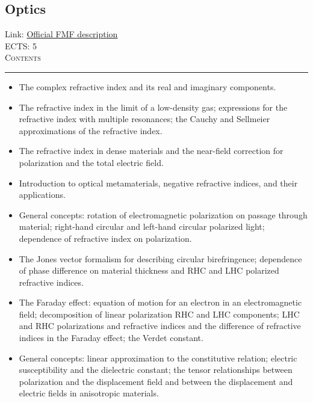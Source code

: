 \documentclass[11pt, a4paper]{article}
\newenvironment{course}[3]{
\subsection{#1}%
Link: \href{#2}{Official FMF description}\\%
ECTS: #3%
\vspace{1ex}
\\
{\large \textsc{Contents}}\\[-0.9ex]%
\rule{\textwidth}{0.5pt}
\vspace{-3ex}
}
{}
\newenvironment{chapter}[1]{
\begin{tcolorbox}[title=#1, breakable]
}
{\end{tcolorbox}}
\begin{document}
\begin{course}{Optics}{https://www.fmf.uni-lj.si/en/study-physics/programmes/1fiz/2020/7000777/courses/1165/}{5}
\begin{chapter}{The refractive index}
\begin{itemize}
            \item The complex refractive index and its real and imaginary components.

            \item The refractive index in the limit of a low-density gas; expressions for the refractive index with multiple resonances; the Cauchy and Sellmeier approximations of the refractive index.

            \item The refractive index in dense materials and the near-field correction for polarization and the total electric field.

            \item Introduction to optical metamaterials, negative refractive indices, and their applications.
        
        \end{itemize}
    \end{chapter}

    \begin{chapter}{Optical activity}
        \begin{itemize}
        
            \item General concepts: rotation of electromagnetic polarization on passage through material; right-hand circular and left-hand circular polarized light; dependence of refractive index on polarization.

            \item The Jones vector formalism for describing circular birefringence; dependence of phase difference on material thickness and RHC and LHC polarized refractive indices.

            \item The Faraday effect: equation of motion for an electron in an electromagnetic field; decomposition of linear polarization RHC and LHC components; LHC and RHC polarizations and refractive indices and the difference of refractive indices in the Faraday effect; the Verdet constant.

        \end{itemize}
    \end{chapter}

    \begin{chapter}{Optically anisotropic materials}
        \begin{itemize}
        
            \item General concepts: linear approximation to the constitutive relation; electric susceptibility and the dielectric constant; the tensor relationships between polarization and the displacement field and between the displacement and electric fields in anisotropic materials.


\end{itemize}
\end{chapter}
\end{course}
\end{document}
